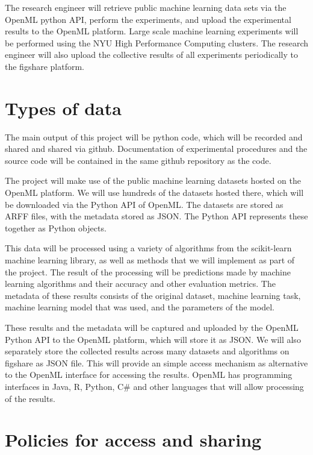 The research engineer will retrieve public machine learning data sets via the
OpenML python API, perform the experiments, and upload the experimental results
to the OpenML platform. Large scale machine learning experiments will be
performed using the NYU High
Performance Computing clusters. The research engineer will also upload the
collective results of all experiments periodically to the figshare platform.

\section{Types of data}

The main output of this project will be python code, which will be recorded and
shared and shared via github. Documentation of experimental procedures and the
source code will be contained in the same github repository as the code.

The project will make use of the public machine learning datasets hosted on the
OpenML platform. We will use hundreds of the datasets hosted there, which will
be downloaded via the Python API of OpenML\@. The datasets are stored as ARFF
files, with the metadata stored as JSON\@. The Python API represents these
together as Python objects.

This data will be processed using a variety of algorithms from the scikit-learn
machine learning library, as well as methods that we will implement as part of
the project. The result of the processing will be predictions made by machine
learning algorithms and their accuracy and other evaluation metrics. The
metadata of these results consists of the original dataset, machine learning
task, machine learning model that was used, and the parameters of the model.

These results and the metadata will be captured and uploaded by the OpenML
Python API to the OpenML platform, which will store it as JSON\@. We will also
separately store the collected results across many datasets and algorithms on
figshare as JSON file. This will provide an  simple access mechanism as
alternative to the OpenML interface for accessing the results. OpenML has
programming interfaces in Java, R, Python, C\# and other languages that will
allow processing of the results.


\section{Policies for access and sharing}

